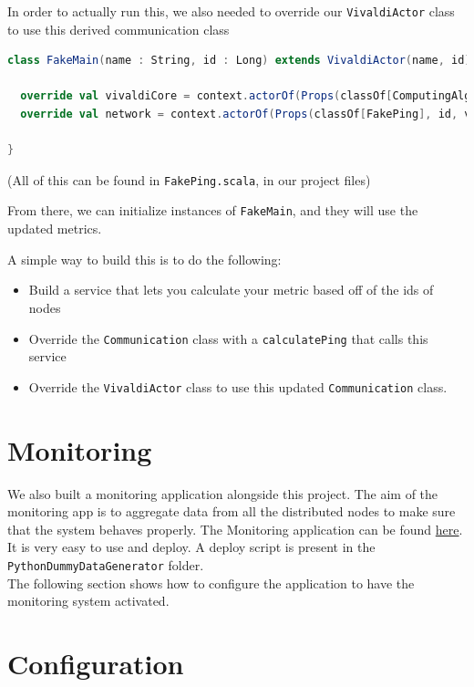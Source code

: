 \documentclass[11pt,a4paper]{article}
\begin{document}
In order to actually run this, we also needed to override our \verb|VivaldiActor| class to use this derived communication class

\begin{lstlisting}[language=scala]
class FakeMain(name : String, id : Long) extends VivaldiActor(name, id) {

  override val vivaldiCore = context.actorOf(Props(classOf[ComputingAlgorithm], self, deltaConf), "VivaldiCore"+id)
  override val network = context.actorOf(Props(classOf[FakePing], id, vivaldiCore, self), "Network"+id)

}
\end{lstlisting}

(All of this can be found in \verb|FakePing.scala|, in our project files)

From there, we can initialize instances of \verb|FakeMain|, and they will use the updated metrics.

A simple way to build this is to do the following: 
\begin{itemize}
\item Build a service that lets you calculate your metric based off of the ids of nodes 
\item Override the \verb|Communication| class with a \verb|calculatePing| that calls this service
\item Override the \verb|VivaldiActor| class to use this updated \verb|Communication| class.
\end{itemize}

\section{Monitoring}
We also built a monitoring application alongside this project. The aim of the monitoring app is to aggregate data from all the distributed nodes to make sure that the system behaves properly. The Monitoring application can be found \href{https://github.com/callicles/VivaldiMonitoringPlay}{here}.\\

It is very easy to use and deploy. A deploy script is present in the  \texttt{PythonDummyDataGenerator} folder.\\

The following section shows how to configure the application to have the monitoring system activated.\\

\section{Configuration}
\end{document}
